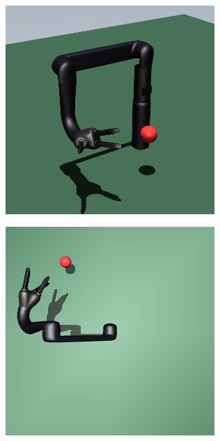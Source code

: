 \begin{figure}
\begin{subfigure}{0.49\columnwidth}
  \end{subfigure}
  \\
  \begin{subfigure}{0.49\columnwidth}
    \includegraphics[width=\linewidth]{figures/chapter6/jaco_sim.png}
  \end{subfigure}
  \begin{subfigure}{0.49\columnwidth}
    \includegraphics[width=\linewidth]{figures/chapter6/jaco_top.png}

\end{subfigure}
\end{figure}
